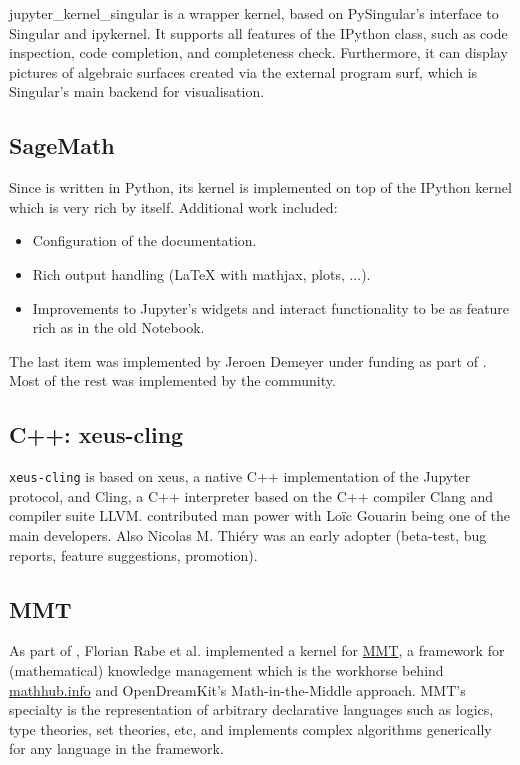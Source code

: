 \documentclass{deliverablereport}
\begin{document}
jupyter\_kernel\_singular is a wrapper kernel, based on PySingular's interface to Singular and ipykernel.
It supports all features of the IPython class, such as code inspection, code completion, and completeness check.
Furthermore, it can display pictures of algebraic surfaces
created via the external program surf, which is Singular's main backend for visualisation.

\subsection{SageMath}

Since \Sage is written in Python, its kernel is implemented
on top of the IPython kernel which is very rich by itself.
Additional work included:
\begin{itemize}
\item Configuration of the documentation.
\item Rich output handling (LaTeX with mathjax, plots, ...).
\item Improvements to Jupyter's widgets and interact functionality to be as feature rich as in the old \Sage Notebook.
\end{itemize}
The last item was implemented by Jeroen Demeyer under \ODK funding as part of .
Most of the rest was implemented by the \Sage community.

\subsection{C++: xeus-cling}

\texttt{xeus-cling} is based on xeus, a native C++ implementation of
the Jupyter protocol, and Cling, a C++ interpreter based on the C++
compiler Clang and compiler suite LLVM. \ODK contributed man power
with Loïc Gouarin being one of the main developers. Also Nicolas M.
Thiéry was an early adopter (beta-test, bug reports, feature
suggestions, promotion).

\subsection{MMT}

As part of , Florian Rabe et al.
implemented a kernel for
\href{https://uniformal.github.io/}{MMT}, a framework for
(mathematical) knowledge management which is the workhorse behind
\url{mathhub.info} and OpenDreamKit's Math-in-the-Middle approach.
MMT's specialty is the representation of arbitrary declarative
languages such as logics, type theories, set theories, etc, and
implements complex algorithms generically for any language in the
framework.
\end{document}
